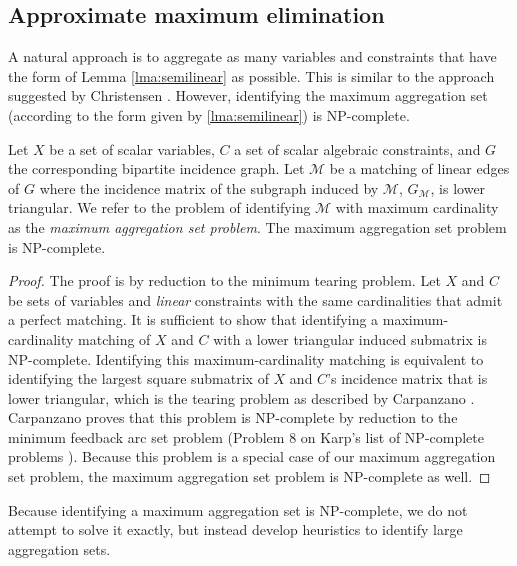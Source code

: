 \documentclass[smallextended]{svjour3}
\newcommand{\rev}[1]{{#1}}
\begin{document}
\subsection{Approximate maximum elimination}
A natural approach is to aggregate as many variables and constraints
that have the form of Lemma \ref{lma:semilinear} as possible.
This is similar to the approach suggested by Christensen \cite{christensen1970}.
However, identifying the maximum aggregation set (according to the form given
by \ref{lma:semilinear}) is NP-complete.
\begin{theorem}
  Let $X$ be a set of scalar variables, $C$ a set of scalar algebraic
  constraints, and $G$ the corresponding bipartite incidence graph.
  Let $\mathcal{M}$ be a matching of linear edges of $G$ where the incidence matrix
  of the subgraph induced by $\mathcal{M}$, $G_\mathcal{M}$, is lower triangular.
  We refer to the problem of identifying $\mathcal{M}$ with maximum cardinality
  as the \textit{maximum aggregation set problem}.
  The maximum aggregation set problem is NP-complete.
  \label{thm:np-complete}
\end{theorem}
\begin{proof}
  The proof is by reduction to the minimum tearing problem.
  Let $X$ and $C$ be sets of variables and {\it linear} constraints with the same
  cardinalities that admit a perfect matching.
  It is sufficient to show that identifying a maximum-cardinality matching
  of $X$ and $C$ with a lower triangular induced submatrix is NP-complete.
  Identifying this maximum-cardinality matching is equivalent to \rev{identifying
  the largest} square submatrix of $X$ and $C$'s incidence matrix that is lower
  triangular, which is the tearing problem as described by Carpanzano
  \cite{carpanzano2000order}. Carpanzano proves that this problem is NP-complete
  by reduction to the minimum feedback arc set problem (Problem 8 on Karp's list
  of NP-complete problems \cite{karp1972reducibility}).
  Because this problem is a special case of our maximum aggregation set problem,
  the maximum aggregation set problem is NP-complete as well.
\end{proof}
Because identifying a maximum aggregation set is NP-complete, we do not attempt
to solve it exactly, but instead develop heuristics to identify large aggregation
sets.
\end{document}
